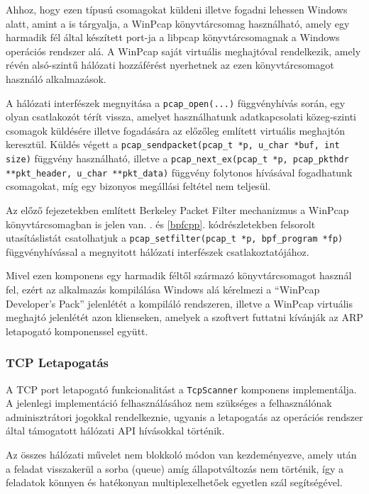 	Ahhoz, hogy ezen típusú csomagokat küldeni illetve fogadni lehessen Windows alatt, amint a \cite{xing10} is tárgyalja, a WinPcap könyvtárcsomag használható, amely egy harmadik fél által készített port-ja a libpcap könyvtárcsomagnak a Windows operációs rendszer alá. A WinPcap saját virtuális meghajtóval rendelkezik, amely révén alsó-szintű hálózati hozzáférést nyerhetnek az ezen könyvtárcsomagot használó alkalmazások.
	
	A hálózati interfészek megnyitása a \texttt{pcap_open(...)} függvényhívás során, egy olyan csatlakozót térít vissza, amelyet használhatunk adatkapcsolati közeg-szinti csomagok küldésére illetve fogadására az előzőleg említett virtuális meghajtón keresztül. Küldés végett a \texttt{pcap_sendpacket(pcap_t *p, u_char *buf, int size)} függvény használható, illetve a \texttt{pcap_next_ex(pcap_t *p, pcap_pkthdr **pkt_header, u_char **pkt_data)} függvény folytonos hívásával fogadhatunk csomagokat, míg egy bizonyos megállási feltétel nem teljesül.
	
	Az előző fejezetekben említett Berkeley Packet Filter mechanizmus a WinPcap könyvtárcsomagban is jelen van. \Az{\ref{bpfasm}}. és \ref{bpfcpp}. kódrészletekben felsorolt utasításlistát csatolhatjuk a \texttt{pcap_setfilter(pcap_t *p, bpf_program *fp)} függvényhívással a megnyitott hálózati interfészek csatlakoztatójához.
	
	Mivel ezen komponens egy harmadik féltől származó könyvtárcsomagot használ fel, ezért az alkalmazás kompilálása Windows alá kérelmezi a ``WinPcap Developer's Pack'' jelenlétét a kompiláló rendszeren, illetve a WinPcap virtuális meghajtó jelenlétét azon klienseken, amelyek a szoftvert futtatni kívánják az ARP letapogató komponenssel együtt.
	
\subsubsection*{TCP Letapogatás} \label{ssec:tcpscan}

	A TCP port letapogató funkcionalitást a \texttt{TcpScanner} komponens implementálja. A jelenlegi implementáció felhasználásához nem szükséges a felhasználónak adminisztrátori jogokkal rendelkeznie, ugyanis a letapogatás az operációs rendszer által támogatott hálózati API hívásokkal történik.
	
	Az összes hálózati művelet nem blokkoló módon van kezdeményezve, amely után a feladat visszakerül a sorba (queue) amíg állapotváltozás nem történik, így a feladatok könnyen és hatékonyan multiplexelhetőek egyetlen szál segítségével.

